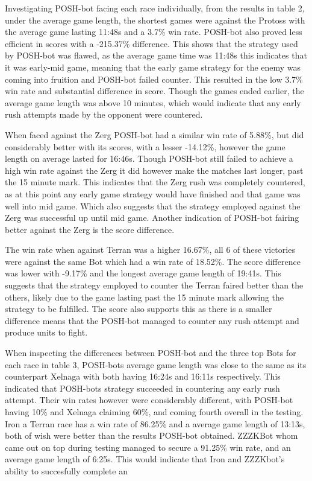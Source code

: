 \documentclass[journal]{IEEEtran}
\begin{document}
Investigating POSH-bot facing each race individually, from the results in table 2, under the average game length, the shortest games were against the Protoss with the average game lasting 11:48s and a 3.7\% win rate. POSH-bot also proved less efficient in scores with a -215.37\% difference. This shows that the strategy used by POSH-bot was flawed, as the average game time was 11:48s this indicates that it was early-mid game, meaning that the early game strategy for the enemy was coming into fruition and POSH-bot failed counter. This resulted in the low 3.7\% win rate and substantial difference in score. Though the games ended earlier, the average game length was above 10 minutes, which would indicate that any early rush attempts made by the opponent were countered.

When faced against the Zerg POSH-bot had a similar win rate of 5.88\%, but did considerably better with its scores, with a lesser -14.12\%, however the game length on average lasted for 16:46s. Though POSH-bot still failed to achieve a high win rate against the Zerg it did however make the matches last longer, past the 15 minute mark. This indicates that the Zerg rush was completely countered, as at this point any early game strategy would have finished and that game was well into mid game. Which also suggests that the strategy employed against the Zerg was successful up until mid game. Another indication of POSH-bot fairing better against the Zerg is the score difference.

The win rate when against Terran was a higher 16.67\%, all 6 of these victories were against the same Bot which had a win rate of 18.52\%. The score difference was lower with -9.17\% and the longest average game length of 19:41s. This suggests that the strategy employed to counter the Terran faired better than the others, likely due to the game lasting past the 15 minute mark allowing the strategy to be fulfilled. The score also supports this as there is a smaller difference means that the POSH-bot managed to counter any rush attempt and produce units to fight.

When inspecting the differences between POSH-bot and the three top Bots for each race in table 3, POSH-bots average game length was close to the same as its counterpart Xelnaga with both having 16:24s and 16:11s respectively. This indicated that POSH-bots strategy succeeded in countering any early rush attempt. Their win rates however were considerably different, with POSH-bot having 10\% and Xelnaga claiming 60\%, and coming fourth overall in the testing. Iron a Terran race has a win rate of 86.25\% and a average game length of 13:13s, both of wish were better than the results POSH-bot obtained. ZZZKBot whom came out on top during testing managed to secure a 91.25\% win rate, and an average game length of 6:25s. This would indicate that Iron and ZZZKbot's ability to succesfully complete an 
\end{document}
